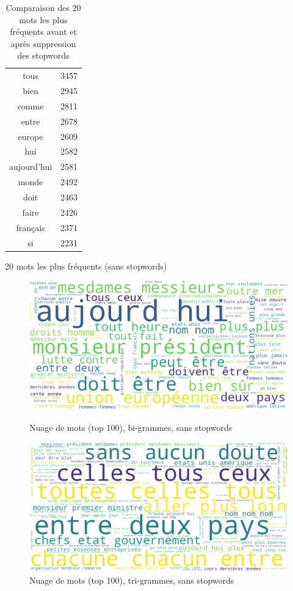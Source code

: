 \documentclass{article}
\begin{document}
\begin{table}[H]
\begin{subtable}{0.45\linewidth}
\begin{tabular}{|c|c|}
tous & 3457 \\
bien & 2945 \\
comme & 2811 \\
entre & 2678 \\
europe & 2609 \\
hui & 2582 \\
aujourd'hui & 2581 \\
monde & 2492 \\
doit & 2463 \\
faire & 2426 \\
français & 2371 \\
si & 2231 \\
\hline
\end{tabular}
\caption{20 mots les plus fréquents (sans stopwords)}
\end{subtable}
\caption{Comparaison des 20 mots les plus fréquents avant et après suppression des stopwords}
\label{tab_pres}
\end{table}

\begin{figure}[H]
    \centering
    \begin{minipage}[b]{0.45\textwidth}
        \includegraphics[width=\textwidth]{./src/locuteur/wordcloud_stopwords_2grams.png} 
        \caption{Nuage de mots (top 100), bi-grammes, sans stopwords}
        \label{wordcloud_stopwords_2grams}
    \end{minipage}
    \hfill
    \begin{minipage}[b]{0.45\textwidth}
        \includegraphics[width=\textwidth]{./src/locuteur/wordcloud_stopwords_3grams.png} 
        \caption{Nuage de mots (top 100), tri-grammes, sans stopwords}
        \label{wordcloud_stopwords_3grams}
    \end{minipage}
\end{figure}
\end{document}
